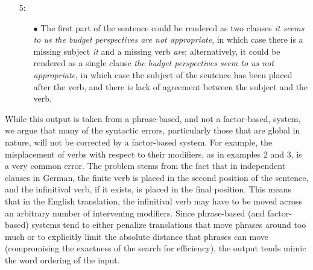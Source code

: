 \documentclass[10pt]{report}
\theoremstyle{plain}
\begin{document}
{\begin{itemize}
\begin{itemize}
well-formed (the insertion of the verb {\em be} would make it so).
\end{itemize}
\item[5:]
\begin{itemize}
\item[$\bullet$] The first part of the sentence could be rendered as
two clauses {\em it seems to us the budget perspectives are not
appropriate}, in which case there is a missing subject {\em it} and a
missing verb {\em are}; alternatively, it could be rendered as a
single clause {\em the budget perspectives seem to us not
appropriate}, in which case the subject of the sentence has been
placed after the verb, and there is lack of agreement between the
subject and the verb.
\end{itemize}
\end{itemize}

While this output is taken from a phrase-based, and not a
factor-based, system, we argue that many of the syntactic errors,
particularly those that are global in nature, will not be corrected by
a factor-based system. For example, the misplacement of verbs with
respect to their modifiers, as in examples 2 and 3, is a very common
error. The problem stems from the fact that in independent clauses in
German, the finite verb is placed in the second position of the
sentence, and the infinitival verb, if it exists, is placed in the
final position. This means that in the English translation, the
infinitival verb may have to be moved across an arbitrary number of
intervening modifiers. Since phrase-based (and factor-based) systems
tend to either penalize translations that move phrases around too much
or to explicitly limit the absolute distance that phrases can move
(compromising the exactness of the search for efficiency), the output
tends mimic the word ordering of the input.

}
\end{document}
